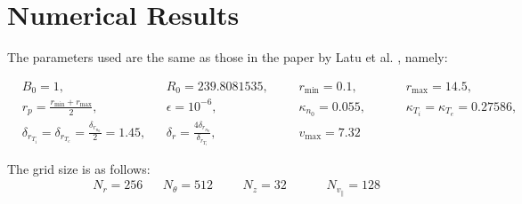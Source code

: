 \section{Numerical Results}

The parameters used are the same as those in the paper by Latu et al. \cite{YamanPaper}, namely:

\begin{align*}
 & B_0=1, && R_0 = 239.8081535, &&& r_{\min}=0.1, &&&& r_{\max}=14.5,\\
 & r_p = \frac{r_{\min}+r_{\max}}{2}, && \epsilon = 10^{-6}, &&& \kappa_{n_0}=0.055, &&&& \kappa_{T_i}=\kappa_{T_e}=0.27586,\\
 & \delta_{r_{T_i}}=\delta_{r_{T_e}}=\frac{\delta_{r_{n_0}}}{2} = 1.45, && \delta_r = \frac{4\delta_{r_{n_0}}}{\delta_{r_{T_i}}}, &&& v_{\max}=7.32 
\end{align*}

The grid size is as follows:
\begin{align*}
 & N_r = 256 && N_\theta = 512 &&& N_z = 32 &&&& N_{v_\parallel} = 128
\end{align*}
